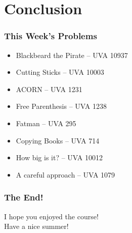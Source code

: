\section{Conclusion}

\begin{frame}
  \frametitle{This Week's Problems}

  \begin{itemize}
  \item Blackbeard the Pirate -- UVA 10937\bigskip

  \item Cutting Sticks -- UVA 10003
  \item ACORN -- UVA 1231\bigskip

  \item Free Parenthesis -- UVA 1238\bigskip

  \item Fatman -- UVA 295
  \item Copying Books -- UVA 714
  \item How big is it? -- UVA 10012\bigskip

  \item A careful approach -- UVA 1079\bigskip
  \end{itemize}

\end{frame}

\begin{frame}
  \frametitle{The End!}

  \begin{center}
    I hope you enjoyed the course!\\
    Have a nice summer!
  \end{center}
\end{frame}
